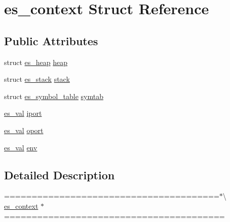 \hypertarget{structes__context}{\section{es\-\_\-context Struct Reference}
\label{structes__context}
}
\subsection*{Public Attributes}
\begin{DoxyCompactItemize}
\item 
struct \hyperlink{structes__heap}{es\-\_\-heap} \hyperlink{structes__context_a6a21a5203e2219b4b5bc3cd45b3d53f2}{heap}
\item 
struct \hyperlink{structes__stack}{es\-\_\-stack} \hyperlink{structes__context_a93ee18e8f9de095135648958dde5fe3b}{stack}
\item 
struct \hyperlink{structes__symbol__table}{es\-\_\-symbol\-\_\-table} \hyperlink{structes__context_a5fbb171d5b44057e5ec545910a11decc}{symtab}
\item 
\hyperlink{eva_8h_a8333c63b2093a13aab6d419c87680d7f}{es\-\_\-val} \hyperlink{structes__context_a9c165cd13f782378c6ca5b3552f22a19}{iport}
\item 
\hyperlink{eva_8h_a8333c63b2093a13aab6d419c87680d7f}{es\-\_\-val} \hyperlink{structes__context_ae1073fb1634ba69accc71be5eff1a461}{oport}
\item 
\hyperlink{eva_8h_a8333c63b2093a13aab6d419c87680d7f}{es\-\_\-val} \hyperlink{structes__context_a6385fe9b6c2bff3edb691b808daf711e}{env}
\end{DoxyCompactItemize}


\subsection{Detailed Description}
=======================================$\ast$\textbackslash{} \hyperlink{structes__context}{es\-\_\-context} $\ast$======================================== 

